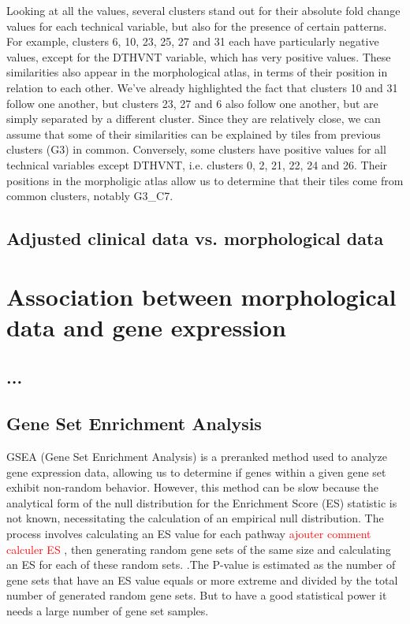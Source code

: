\documentclass[a4paper, 11pt]{article}
\begin{document}
\begin{multicols}{2}
Looking at all the values, several clusters stand out for their absolute fold change values for each technical variable, but also for the presence of certain patterns. For example, clusters 6, 10, 23, 25, 27 and 31 each have particularly negative values, except for the DTHVNT variable, which has very positive values. These similarities also appear in the morphological atlas, in terms of their position in relation to each other. We've already highlighted the fact that clusters 10 and 31 follow one another, but clusters 23, 27 and 6 also follow one another, but are simply separated by a different cluster. Since they are relatively close, we can assume that some of their similarities can be explained by tiles from previous clusters (G3) in common. Conversely, some clusters have positive values for all technical variables except DTHVNT, i.e. clusters 0, 2, 21, 22, 24 and 26. Their positions in the morpholigic atlas allow us to determine that their tiles come from common clusters, notably G3\_C7.

\subsection{Adjusted clinical data vs. morphological data}

\section{Association between morphological data and gene expression}
\subsection{...}
\subsection{Gene Set Enrichment Analysis}
GSEA (Gene Set Enrichment Analysis) is a preranked method used to analyze gene expression data, allowing us to determine if genes within a given gene set exhibit non-random behavior. However, this method can be slow because the analytical form of the null distribution for the Enrichment Score (ES) statistic is not known, necessitating the calculation of an empirical null distribution.
The process involves calculating an ES value for each pathway \textcolor{red} { ajouter comment calculer ES }, then generating random gene sets of the same size and calculating an ES for each of these random sets. .The P-value is estimated as the number of gene sets that have an ES value equals or more extreme and divided by the total number of generated random gene sets. But to have a good statistical power it needs a large number of gene set samples.


\end{multicols}
\end{document}
